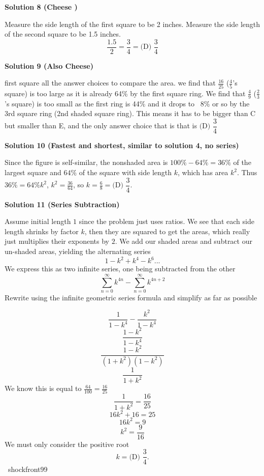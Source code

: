\begin{enumerate}
\textbf{Solution 8 (Cheese )}

Measure the side length of the first square to be 2 inches. Measure the side length of the second square to be 1.5 inches. 
 \[\frac{1.5}{2} = \frac{3}{4} = \boxed{\text{(D) } \frac{3}{4}}\]




\textbf{Solution 9 (Also Cheese)}

first square all the answer choices to compare the area. we find that $\frac{16}{25}$  ($\frac{4}{5}$'s square) is too large as it is already 64\% by the first square ring. We find that $\frac{4}{9}$  ($\frac{2}{3}$'s square) is too small as the first ring is 44\% and it drops to ~8\% or so by the 3rd square ring (2nd shaded square ring). This means it has to be bigger than C but smaller than E, and the only answer choice that is that is $\boxed{\text{(D) }\dfrac{3}{4}}$




\textbf{Solution 10 (Fastest and shortest, similar to solution 4, no series)}

Since the figure is self-similar, the nonshaded area is $100\%-64\% = 36\%$ of the largest square and $64\%$ of the square with side length $k$, which has area $k^2$. Thus $36\% = 64\%k^2$, $k^2 = \frac{36}{64}$, so $k = \frac{6}{8} = \boxed{\text{(D) }\dfrac{3}{4}}$.

 



\textbf{Solution 11 (Series Subtraction)}

Assume initial length $1$ since the problem just uses ratios. We see that each side length shrinks by factor $k$, then they are squared to get the areas, which really just multiplies their exponents by $2$. We add our shaded areas and subtract our un-shaded areas, yielding the alternating series 
 \[1 - k^{2} + k^{4} - k^{6}...\]We express this as two infinite series, one being subtracted from the other
 \[\sum_{n=0}^{\infty} k^{4n} -\sum_{n=0}^{\infty} k^{4n+2}\]Rewrite using the infinite geometric series formula and simplify as far as possible

 
 \[\frac{1}{1-k^{4}} - \frac{k^{2}}{1-k^{4}}\]
 \[\frac{1-k^{2}}{1-k^{4}}\]
 \[\frac{1-k^{2}}{(1+k^{2})(1-k^{2})}\]
 \[\frac{1}{1+k^{2}}\]We know this is equal to $\frac{64}{100} = \frac{16}{25}$
 \[\frac{1}{1+k^{2}} = \frac{16}{25}\]
 \[16k^{2}+16 =25\]
 \[16k^{2} = 9\]
 \[k^{2} = \frac{9}{16}\]We must only consider the positive root
 \[k=\boxed{\text{(D) }\dfrac{3}{4}}.\]~shockfront99


\end{enumerate}
